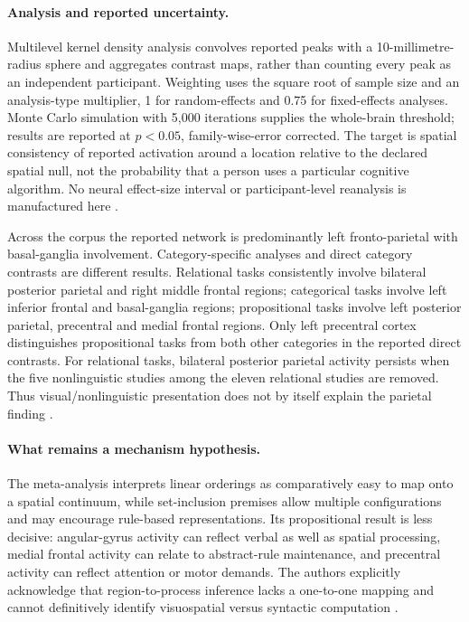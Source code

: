 \paragraph{Analysis and reported uncertainty.}
Multilevel kernel density analysis convolves reported peaks with a
10-millimetre-radius sphere and aggregates contrast maps, rather than
counting every peak as an independent participant. Weighting uses the
square root of sample size and an analysis-type multiplier, 1 for
random-effects and 0.75 for fixed-effects analyses. Monte Carlo simulation
with 5,000 iterations supplies the whole-brain threshold; results are
reported at \(p<0.05\), family-wise-error corrected. The target is
spatial consistency of reported activation around a location relative
to the declared spatial null, not the probability that a person uses
a particular cognitive algorithm. No neural effect-size interval or
participant-level reanalysis is manufactured here
\cite[pp.~3485, 3488]{PradoChadhaBooth2011DeductionMeta}.

Across the corpus the reported network is predominantly left
fronto-parietal with basal-ganglia involvement. Category-specific analyses
and direct category contrasts are different results. Relational tasks
consistently involve bilateral posterior parietal and right middle frontal
regions; categorical tasks involve left inferior frontal and basal-ganglia
regions; propositional tasks involve left posterior parietal, precentral
and medial frontal regions. Only left precentral cortex distinguishes
propositional tasks from both other categories in the reported direct
contrasts. For relational tasks, bilateral posterior parietal activity
persists when the five nonlinguistic studies among the eleven relational
studies are removed. Thus visual/nonlinguistic presentation does not
by itself explain the parietal finding
\cite[pp.~3489--3494, tables~2--3]{PradoChadhaBooth2011DeductionMeta}.

\paragraph{What remains a mechanism hypothesis.}
The meta-analysis interprets linear orderings as comparatively easy to
map onto a spatial continuum, while set-inclusion premises allow multiple
configurations and may encourage rule-based representations. Its
propositional result is less decisive: angular-gyrus activity can reflect
verbal as well as spatial processing, medial frontal activity can relate
to abstract-rule maintenance, and precentral activity can reflect
attention or motor demands. The authors explicitly acknowledge that
region-to-process inference lacks a one-to-one mapping and cannot
definitively identify visuospatial versus syntactic computation
\cite[pp.~3492--3494]{PradoChadhaBooth2011DeductionMeta}.

